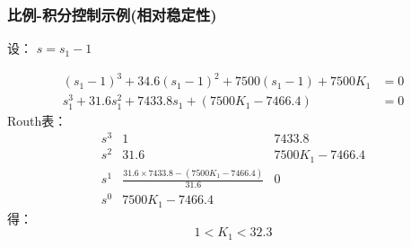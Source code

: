 \documentclass{article}
\begin{document}
\begin{frame}
\frametitle{比例-积分控制示例(相对稳定性)}
\label{sec-4-3-4}

设： $s=s_1-1$

\begin{align*}
(s_1-1)^3+34.6(s_1-1)^2+7500(s_1-1)+7500K_1 &=0 \\
s_1^3 + 31.6 s_1^2+7433.8s_1+(7500K_1-7466.4)&=0
\end{align*}
Routh表：
\[
\begin{matrix}
s^3 & 1    & 7433.8 \\
s^2 & 31.6 & 7500K_1-7466.4 \\
s^1 & \frac{31.6\times 7433.8-(7500K_1-7466.4)}{31.6} & 0 \\
s^0 & 7500K_1-7466.4
\end{matrix}
\]
得： 
\[
1<K_1<32.3
\]
\end{frame}
\end{document}
